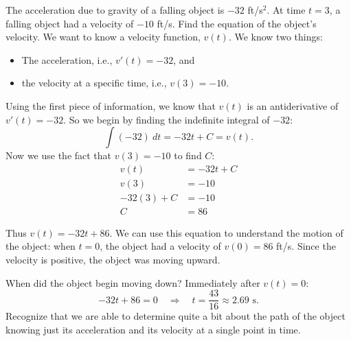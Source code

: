 \begin{example}
The acceleration due to gravity of a falling object is $-32$ ft/s$^2$. At time $t=3$, a falling object had a velocity of $-10$ ft/s. Find the equation of the object's velocity.
We want to know a velocity function, $v(t)$. We know two things:
\begin{itemize}
\item The acceleration, i.e., $v'(t)= -32$, and
\item the velocity at a specific time, i.e., $v(3) = -10$.
\end{itemize}
Using the first piece of information, we know that $v(t)$ is an antiderivative of $v'(t)=-32$. So we begin by finding the indefinite integral of $-32$:
\[ \int (-32)\ dt = -32t+C=v(t). \]
Now we use the fact that $v(3)=-10$ to find $C$:
\begin{align*}
v(t) &= -32t+C \\
v(3) &= -10 \\
-32(3)+C &= -10\\
C &= 86
\end{align*}

Thus $v(t)= -32t+86$. We can use this equation to understand the motion of the object: when $t=0$, the object had a velocity of $v(0) = 86$ ft/s. Since the velocity is positive, the object was moving upward.

When did the object begin moving down? Immediately after $v(t) = 0$:
\[ -32t+86 = 0 \quad \Rightarrow \quad  t = \frac{43}{16}  \approx 2.69\text{ s}. \]
Recognize that we are able to determine quite a bit about the path of the object knowing just its acceleration and its velocity at a single point in time.
\end{example}